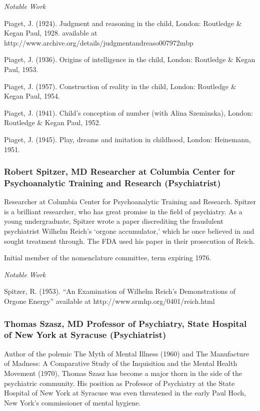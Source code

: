 \begin{refsection}
\emph{Notable Work}

Piaget, J. (1924). Judgment and reasoning in the child, London: Routledge \& Kegan Paul, 1928. available at http:\slash \slash www.archive.org\slash details\slash judgmentandreaso007972mbp

Piaget, J. (1936). Origins of intelligence in the child, London: Routledge \& Kegan Paul, 1953.

Piaget, J. (1957). Construction of reality in the child, London: Routledge \& Kegan Paul, 1954.

Piaget, J. (1941). Child's conception of number (with Alina Szeminska), London: Routledge \& Kegan Paul, 1952.

Piaget, J. (1945). Play, dreams and imitation in childhood, London: Heinemann, 1951.

\subsubsection{Robert Spitzer, MD Researcher at Columbia Center for Psychoanalytic Training and Research (Psychiatrist)}
\label{robertspitzermdresearcheratcolumbiacenterforpsychoanalytictrainingandresearchpsychiatrist}

Researcher at Columbia Center for Psychoanalytic Training and Research. Spitzer is a brilliant researcher, who has great promise in the field of psychiatry. As a young undergraduate, Spitzer wrote a paper discrediting the fraudulent psychiatrist Wilhelm Reich's `orgone accumulator,' which he once believed in and sought treatment through. The FDA used his paper in their prosecution of Reich.

Initial member of the nomenclature committee, term expiring 1976.

\emph{Notable Work}

Spitzer, R. (1953). ``An Examination of Wilhelm Reich's Demonstrations of Orgone Energy'' available at http:\slash \slash www.srmhp.org\slash 0401\slash reich.html

\subsubsection{Thomas Szasz, MD Professor of Psychiatry, State Hospital of New York at Syracuse (Psychiatrist)}
\label{thomasszaszmdprofessorofpsychiatrystatehospitalofnewyorkatsyracusepsychiatrist}

Author of the polemic The Myth of Mental Illness (1960) and The Manufacture of Madness: A Comparative Study of the Inquisition and the Mental Health Movement (1970), Thomas Szasz has become a major thorn in the side of the psychiatric community. His position as Professor of Psychiatry at the State Hospital of New York at Syracuse was even threatened in the early Paul Hoch, New York's commissioner of mental hygiene.


\end{refsection}
